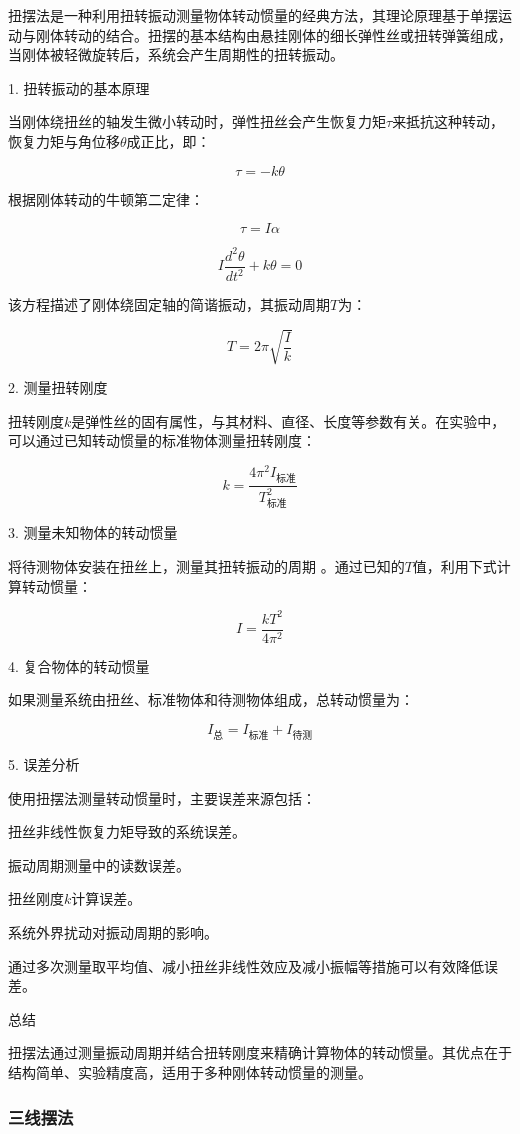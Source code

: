 \documentclass[12pt,hyperref,a4paper,UTF8]{ctexart}
\begin{document}
扭摆法是一种利用扭转振动测量物体转动惯量的经典方法，其理论原理基于单摆运动与刚体转动的结合。扭摆的基本结构由悬挂刚体的细长弹性丝或扭转弹簧组成，当刚体被轻微旋转后，系统会产生周期性的扭转振动。

1. 扭转振动的基本原理

当刚体绕扭丝的轴发生微小转动时，弹性扭丝会产生恢复力矩$\tau$来抵抗这种转动，恢复力矩与角位移$\theta$成正比，即：

$$ \tau = -k \theta $$

根据刚体转动的牛顿第二定律：

$$ \tau = I \alpha $$

$$ I \frac{d^2\theta}{dt^2} + k\theta = 0 $$

该方程描述了刚体绕固定轴的简谐振动，其振动周期$T$为：

$$T = 2\pi \sqrt{\frac{I}{k}}$$

2. 测量扭转刚度 

扭转刚度$k$是弹性丝的固有属性，与其材料、直径、长度等参数有关。在实验中，可以通过已知转动惯量的标准物体测量扭转刚度：

$$k = \frac{4\pi^2 I_{\text{标准}}}{T_{\text{标准}}^2}$$

3. 测量未知物体的转动惯量

将待测物体安装在扭丝上，测量其扭转振动的周期 。通过已知的$T$值，利用下式计算转动惯量：

$$I = \frac{k T^2}{4\pi^2}$$

4. 复合物体的转动惯量

如果测量系统由扭丝、标准物体和待测物体组成，总转动惯量为：

$$I_{\text{总}} = I_{\text{标准}} + I_{\text{待测}}$$

5. 误差分析

使用扭摆法测量转动惯量时，主要误差来源包括：

扭丝非线性恢复力矩导致的系统误差。

振动周期测量中的读数误差。

扭丝刚度$k$计算误差。

系统外界扰动对振动周期的影响。


通过多次测量取平均值、减小扭丝非线性效应及减小振幅等措施可以有效降低误差。

总结

扭摆法通过测量振动周期并结合扭转刚度来精确计算物体的转动惯量。其优点在于结构简单、实验精度高，适用于多种刚体转动惯量的测量。

\subsubsection{三线摆法}
\end{document}
